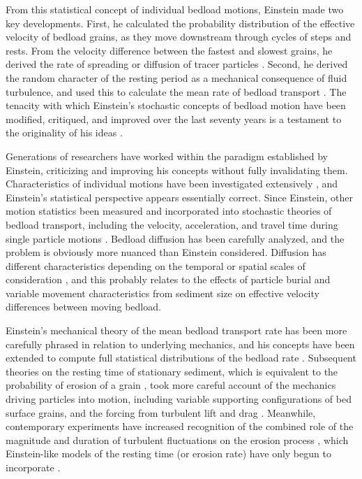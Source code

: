\documentclass{article}
\begin{document}
From this statistical concept of individual bedload motions, Einstein made two key developments. 
First, he calculated the probability distribution of the effective velocity of bedload grains, as they move downstream through cycles of steps and rests. 
From the velocity difference between the fastest and slowest grains, he derived the rate of spreading or diffusion of tracer particles \citep{Einstein1937}.
Second, he derived the random character of the resting period as a mechanical consequence of fluid turbulence, and used this to calculate the mean rate of bedload transport \citep{Einstein1950}. 
The tenacity with which Einstein's stochastic concepts of bedload motion have been modified, critiqued, and improved over the last seventy years is a testament to the originality of his ideas \citep{Ettema2004}. 

Generations of researchers have worked within the paradigm established by Einstein, criticizing and improving his concepts without fully invalidating them.  
Characteristics of individual motions have been investigated extensively \citep{Crickmore1962, Hubbell1964, Yano1969, Nakagawa1976, Drake1988, Hassan1991, Habersack2001, Ancey2008, Roseberry2012, Heyman2013, Fathel2015, Heyman2016}, and Einstein's statistical perspective appears essentially correct. 
Since Einstein, other motion statistics been measured and incorporated into stochastic theories of bedload transport, including the velocity, acceleration, and travel time during single particle motions \citep{Drake1988, Radice2006, Ancey2008, Lajeunesse2010, Furbish2012a, Roseberry2012, Fathel2015, Furbish2016,  Heyman2016}. 
Bedload diffusion has been carefully analyzed, and the problem is obviously more nuanced than Einstein considered. 
Diffusion has different characteristics depending on the temporal or spatial scales of consideration \citep{Nikora2002, Zhang2012, Martin2012}, and this probably relates to the effects of particle burial \citep{Yang1971, Nakagawa1980, Voepel2013, Martin2014, Bradley2017} and variable movement characteristics from sediment size \citep{Fan2017} on effective velocity differences between moving bedload. 

Einstein's mechanical theory of the mean bedload transport rate \citep{Einstein1950} has been more carefully phrased in relation to underlying mechanics, and his concepts have been extended to compute full statistical distributions of the bedload rate \citep{Sun2000, Ancey2006, Ancey2008}. 
Subsequent theories on the resting time of stationary sediment, which is equivalent to the probability of erosion of a grain \citep{Yalin1972}, took more careful account of the mechanics driving particles into motion, including variable supporting configurations of bed surface grains, and the forcing from turbulent lift and drag \citep{Paintal1971, Wu2004, Dey2018}.
Meanwhile, contemporary experiments have increased recognition of the combined role of the magnitude and duration of turbulent fluctuations on the erosion process \citep{Diplas2008, Valyrakis2010, Celik2014}, which Einstein-like models of the resting time (or erosion rate) have only begun to incorporate \citep{Tregnaghi2012,Dey2018}. 
\end{document}
